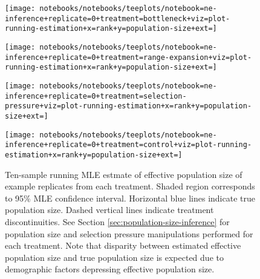 \begin{figure}
  \centering
  \begin{minipage}{\textwidth} %

    \begin{minipage}{0.5\textwidth}
      \centering
      \texttt{[image: notebooks/notebooks/teeplots/notebook=ne-inference+replicate=0+treatment=bottleneck+viz=plot-running-estimation+x=rank+y=population-size+ext=]}
      \label{fig:ne-example-replicates:bottleneck}
    \end{minipage}%
    \begin{minipage}{0.5\textwidth}
      \centering
      \texttt{[image: notebooks/notebooks/teeplots/notebook=ne-inference+replicate=0+treatment=range-expansion+viz=plot-running-estimation+x=rank+y=population-size+ext=]}
      \label{fig:ne-example-replicates:range_expansion}
    \end{minipage}

    \begin{minipage}{0.5\textwidth}
      \centering
      \texttt{[image: notebooks/notebooks/teeplots/notebook=ne-inference+replicate=0+treatment=selection-pressure+viz=plot-running-estimation+x=rank+y=population-size+ext=]}
      \label{fig:ne-example-replicates:selection_pressure}
    \end{minipage}%
    \begin{minipage}{0.5\textwidth}
      \centering
      \texttt{[image: notebooks/notebooks/teeplots/notebook=ne-inference+replicate=0+treatment=control+viz=plot-running-estimation+x=rank+y=population-size+ext=]}
      \label{fig:ne-example-replicates:control}
    \end{minipage}

  \end{minipage}
  \hfill %
  \begin{minipage}{\textwidth} %
    \vspace{2ex}
    \caption{Ten-sample running MLE estmate of effective population size of example replicates from  each treatment.
    Shaded region corresponds to 95\% MLE confidence interval.
    Horizontal blue lines indicate true population size.
    Dashed vertical lines indicate treatment discontinuities.
    See Section \ref{sec:population-size-inference} for population size and selection pressure manipulations performed for each treatment.
    Note that disparity between estimated effective population size and true population size is expected due to demographic factors depressing effective population size.
    }
    \label{fig:ne-example-replicates}
  \end{minipage}

\end{figure}


